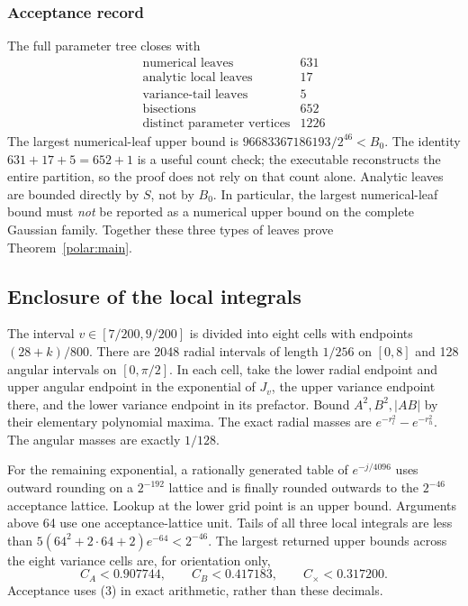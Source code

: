 \subsubsection{Acceptance record}
The full parameter tree closes with
\[
 \begin{array}{c|r}
 \text{numerical leaves}&631\\
 \text{analytic local leaves}&17\\
 \text{variance-tail leaves}&5\\
 \text{bisections}&652\\
 \text{distinct parameter vertices}&1226
 \end{array}
\]
The largest numerical-leaf upper bound is
$96683367186193/2^{46}<B_0$. The identity
$631+17+5=652+1$ is a useful count check; the executable reconstructs
the entire partition, so the proof does not rely on that count alone.
Analytic leaves are bounded directly by $S$, not by $B_0$.
In particular, the largest numerical-leaf bound must \emph{not} be
reported as a numerical upper bound on the complete Gaussian family.
Together these three types of leaves prove Theorem~\ref{polar:main}.

\subsection{Enclosure of the local integrals}
The interval $v\in[7/200,9/200]$ is divided into eight cells with
endpoints $(28+k)/800$. There are 2048 radial intervals of length
$1/256$ on $[0,8]$ and 128 angular intervals on $[0,\pi/2]$.
In each cell, take the lower radial endpoint and upper angular endpoint
in the exponential of $J_v$, the upper variance endpoint there, and
the lower variance endpoint in its prefactor. Bound $A^2,B^2,|AB|$
by their elementary polynomial maxima. The exact radial masses are
$e^{-r_l^2}-e^{-r_h^2}$. The angular masses are exactly $1/128$.

For the remaining exponential, a rationally generated table of
$e^{-j/4096}$ uses outward rounding on a $2^{-192}$ lattice and is
finally rounded outwards to the $2^{-46}$ acceptance lattice. Lookup
at the lower grid point is an upper bound. Arguments above 64 use
one acceptance-lattice unit. Tails of all three local integrals are
less than $5(64^2+2\cdot64+2)e^{-64}<2^{-46}$.
The largest returned upper bounds across the eight variance cells are,
for orientation only,
\[
 C_A<0.907744,\qquad C_B<0.417183,\qquad C_\times<0.317200.
\]
Acceptance uses (3) in exact arithmetic, rather than these decimals.

